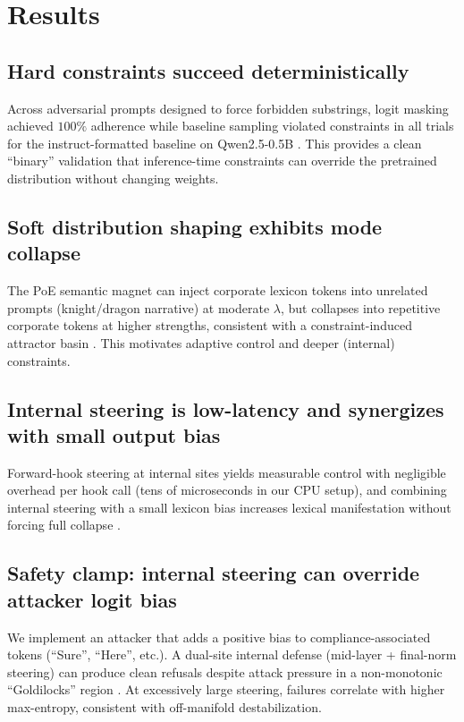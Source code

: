 \documentclass{article}
\begin{document}
\section{Results}

\subsection{Hard constraints succeed deterministically}
Across adversarial prompts designed to force forbidden substrings, logit masking achieved $100\%$ adherence while baseline sampling violated constraints in all trials for the instruct-formatted baseline on Qwen2.5-0.5B \citep{thiswork2026}.
This provides a clean ``binary'' validation that inference-time constraints can override the pretrained distribution without changing weights.

\subsection{Soft distribution shaping exhibits mode collapse}
The PoE semantic magnet can inject corporate lexicon tokens into unrelated prompts (knight/dragon narrative) at moderate $\lambda$, but collapses into repetitive corporate tokens at higher strengths, consistent with a constraint-induced attractor basin \citep{thiswork2026}.
This motivates adaptive control and deeper (internal) constraints.

\subsection{Internal steering is low-latency and synergizes with small output bias}
Forward-hook steering at internal sites yields measurable control with negligible overhead per hook call (tens of microseconds in our CPU setup), and combining internal steering with a small lexicon bias increases lexical manifestation without forcing full collapse \citep{thiswork2026}.

\subsection{Safety clamp: internal steering can override attacker logit bias}
We implement an attacker that adds a positive bias to compliance-associated tokens (``Sure'', ``Here'', etc.).
A dual-site internal defense (mid-layer + final-norm steering) can produce clean refusals despite attack pressure in a non-monotonic ``Goldilocks'' region \citep{thiswork2026}.
At excessively large steering, failures correlate with higher max-entropy, consistent with off-manifold destabilization.
\end{document}
